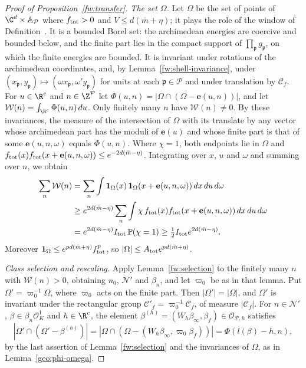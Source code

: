 \begin{proof}[Proof of Proposition~\ref{fw:transfer}]
\emph{The set $\Omega$.} Let $\Omega$ be the set of points of
$\C^d\times\mathbb A_{\mathcal P}$ where $f_{\rm tot}>0$ and $V\le d(\bar m+\eta)$;
it plays the role of the window of Definition~. It is a
bounded Borel set: the archimedean energies are coercive and bounded
below, and the finite part lies in the compact support of
$\prod_{\mathfrak p}g_{\mathfrak p}$, on which the finite energies are
bounded. It is invariant under rotations of the archimedean
coordinates, and, by Lemma~\ref{fw:shell-invariance}, under
$(x_{\mathfrak p},y_{\mathfrak p})\mapsto(\omega x_{\mathfrak
p},\omega'y_{\mathfrak p})$ for units at each $\mathfrak p\in\mathcal P$
and under translation by $\mathcal C_f$. For $u\in\R^c$ and
$n\in\Z^{\mathcal P}$ let $\Phi(u,n)=|\Omega\cap(\Omega-\mathbf e(u,n))|$, and
let $\mathcal W(n)=\int_{\R^c}\Phi(u,n)\,du$. Only finitely many $n$ have
$\mathcal W(n)\ne0$. By these invariances, the measure of the
intersection of $\Omega$ with its translate by any vector whose
archimedean part has the moduli of $\mathbf e(u)$ and whose finite part is
that of some $\mathbf e(u,n,\omega)$ equals $\Phi(u,n)$. Where $\chi=1$, both
endpoints lie in $\Omega$ and $f_{\rm tot}(x)f_{\rm tot}(x+\mathbf e(u,n,\omega))\le
e^{-2d(\bar m-\eta)}$. Integrating over $x$, $u$ and $\omega$ and
summing over $n$, we obtain
\[
 \begin{split}
 \sum_n\mathcal W(n)
 &=\sum_n\int\mathbf 1_\Omega(x)\,\mathbf 1_\Omega(x+\mathbf e(u,n,\omega))\,
 dx\,du\,d\omega\\
 &\ge e^{2d(\bar m-\eta)}\sum_n\int\chi\,f_{\rm tot}(x)f_{\rm tot}(x+\mathbf e(u,n,\omega))\,
 dx\,du\,d\omega\\
 &=e^{2d(\bar m-\eta)}I_{\rm tot}\,\mathbb P(\chi=1)
 \ge\tfrac12I_{\rm tot}e^{2d(\bar m-\eta)} .
 \end{split}
\]
Moreover $\mathbf 1_\Omega\le e^{pd(\bar m+\eta)}f_{\rm tot}^p$, so
$|\Omega|\le A_{\rm tot}e^{pd(\bar m+\eta)}$.

\emph{Class selection and rescaling.} Apply Lemma~\ref{fw:selection} to
the finitely many $n$ with $\mathcal W(n)>0$, obtaining $n_0$,
$\mathcal N'$ and $\beta_n$, and let $\varpi_0$ be as in that lemma.
Put $\Omega'=\varpi_0^{-1}\Omega$, where $\varpi_0$ acts on the finite
part. Then $|\Omega'|=|\Omega|$, and $\Omega'$ is invariant under the
rectangular group $\mathcal C'_f=\varpi_0^{-1}\mathcal C_f$, of measure
$|\mathcal C_f|$. For $n\in\mathcal N'$, $\beta\in\beta_n\mathcal O_K^1$
and $h\in\R^c$, the element $\beta^{(h)}=(W_h\beta_\infty,\beta_f)\in
\mathcal O_{\mathcal P,h}$ satisfies
\[
 |\Omega'\cap(\Omega'-\beta^{(h)})|=|\Omega\cap(\Omega-(W_h\beta_\infty,
 \varpi_0\beta_f))|=\Phi(l(\beta)-h,n),
\]
by the last assertion of Lemma~\ref{fw:selection} and the invariances of
$\Omega$, as in Lemma~\ref{geo:phi-omega}.


\end{proof}

